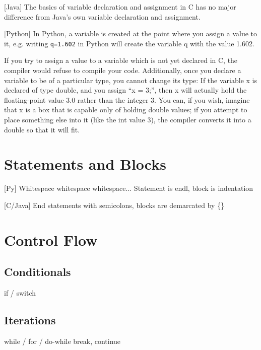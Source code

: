 \documentclass[oneside]{book}
\theoremstyle{definition}
\begin{document}
    [Java]
    The basics of variable declaration and assignment in C has no major difference from Java's own variable declaration and assignment.
    
    [Python]
    In Python, a variable is created at the point where you assign a value to it, e.g. writing \texttt{q=1.602} in Python will create the variable q with the value 1.602. 
    
    If you try to assign a value to a variable which is not yet declared in C, the compiler would refuse to compile your code. Additionally, once you declare a variable to be of a particular type, you cannot change its type: If the variable x is declared of type double, and you assign “x = 3;”, then x will actually hold the floating-point value 3.0 rather than the integer 3. You can, if you wish, imagine that x is a box that is capable only of holding double values; if you attempt to place something else into it (like the int value 3), the compiler converts it into a double so that it will fit. %


    
    \section{Statements and Blocks}
    [Py] Whitespace whitespace whitespace...
    Statement is endl, block is indentation

    [C/Java] End statements with semicolons, blocks are demarcated by  \{\}
    
    \section{Control Flow}
        \subsection{Conditionals}
        if / switch
        \subsection{Iterations}
        while / for / do-while
        break, continue
\end{document}
